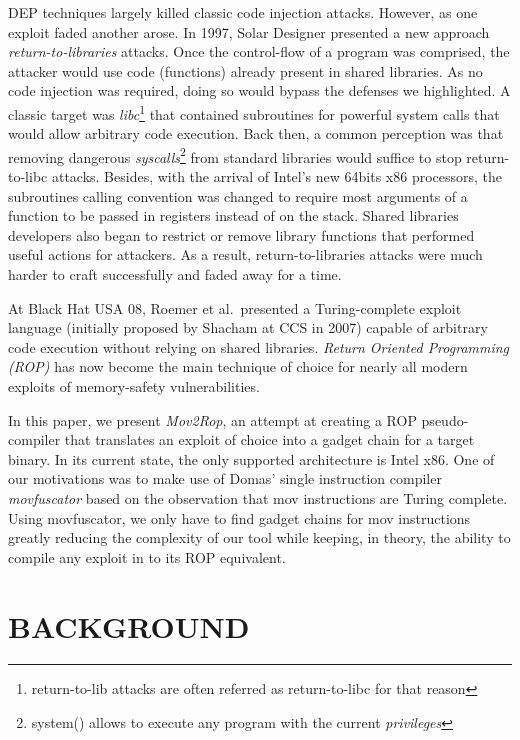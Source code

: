 \documentclass[10pt,twocolumn]{article}
\begin{document}
DEP techniques largely killed classic code injection attacks.  However, as one
exploit faded another arose. In 1997, Solar Designer presented a new approach
\textit{return-to-libraries}\cite{solar_returnintolib_1997} attacks. Once the
control-flow of a program was comprised, the attacker would use code
(functions) already present in shared libraries. As no code injection was
required, doing so would bypass the defenses we highlighted. A classic target
was \textit{libc}\footnote{return-to-lib attacks are often referred as
return-to-libc for that reason} that contained subroutines for powerful system
calls that would allow arbitrary code execution. Back then, a common perception
was that removing dangerous \textit{syscalls}\footnote{system() allows to
execute any program with the current \textit{privileges}} from standard libraries
would suffice to stop return-to-libc attacks.  Besides, with the arrival of
Intel's new 64bits x86 processors, the subroutines calling convention was
changed to require most arguments of a function to be passed in registers
instead of on the stack. Shared libraries developers also began to restrict or
remove library functions that performed useful actions for attackers. As a
result, return-to-libraries attacks were much harder to craft successfully and
faded away for a time.

At Black Hat USA 08, Roemer et al.\ presented a Turing-complete exploit
language (initially proposed by Shacham\cite{shacham_rop_2007} at CCS in
2007) capable of arbitrary code execution without relying on shared libraries.
\textit{Return Oriented Programming (ROP)}\cite{roemer_return-oriented_2012}
has now become the main technique of choice for nearly all modern exploits of
memory-safety vulnerabilities.

In this paper, we present \textit{Mov2Rop}, an attempt at creating a ROP
pseudo-compiler that translates an exploit of choice into a gadget chain for a
target binary. In its current state, the only supported architecture is Intel
x86. One of our motivations was to make use of Domas' single instruction
compiler \textit{movfuscator}\cite{domas_movfuscator} based on the observation
that mov instructions are Turing complete\cite{dolan_mov_2013}. Using
movfuscator, we only have to find gadget chains for mov instructions greatly
reducing the complexity of our tool while keeping, in theory, the ability to
compile any exploit in to its ROP equivalent.


\section{BACKGROUND}
\end{document}
